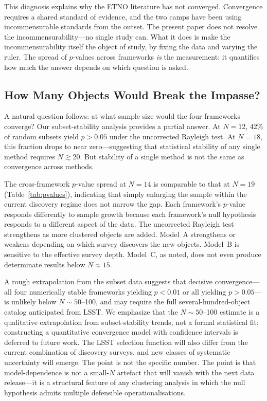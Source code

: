 \documentclass[12pt,a4paper]{article}
\begin{document}
This diagnosis explains why the ETNO literature has not converged. Convergence requires a shared standard of evidence, and the two camps have been using incommensurable standards from the outset. The present paper does not resolve the incommensurability---no single study can. What it does is make the incommensurability itself the object of study, by fixing the data and varying the ruler. The spread of $p$-values across frameworks \textit{is} the measurement: it quantifies how much the answer depends on which question is asked.

\subsection{How Many Objects Would Break the Impasse?}

A natural question follows: at what sample size would the four frameworks converge? Our subset-stability analysis provides a partial answer. At $N=12$, 42\% of random subsets yield $p>0.05$ under the uncorrected Rayleigh test. At $N=18$, this fraction drops to near zero---suggesting that statistical stability of any single method requires $N\gtrsim20$. But stability of a single method is not the same as convergence across methods.

The cross-framework $p$-value spread at $N=14$ is comparable to that at $N=19$ (Table~\ref{tab:pvalues}), indicating that simply enlarging the sample within the current discovery regime does not narrow the gap. Each framework's $p$-value responds differently to sample growth because each framework's null hypothesis responds to a different aspect of the data. The uncorrected Rayleigh test strengthens as more clustered objects are added. Model~A strengthens or weakens depending on which survey discovers the new objects. Model~B is sensitive to the effective survey depth. Model~C, as noted, does not even produce determinate results below $N\approx15$.

A rough extrapolation from the subset data suggests that decisive convergence---all four numerically stable frameworks yielding $p<0.01$ or all yielding $p>0.05$---is unlikely below $N\sim50$--100, and may require the full several-hundred-object catalog anticipated from LSST. We emphasize that the $N\sim50$--100 estimate is a qualitative extrapolation from subset-stability trends, not a formal statistical fit; constructing a quantitative convergence model with confidence intervals is deferred to future work. The LSST selection function will also differ from the current combination of discovery surveys, and new classes of systematic uncertainty will emerge. The point is not the specific number. The point is that model-dependence is not a small-$N$ artefact that will vanish with the next data release---it is a structural feature of any clustering analysis in which the null hypothesis admits multiple defensible operationalisations.
\end{document}
